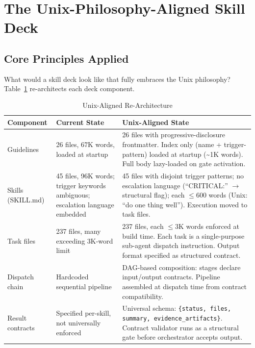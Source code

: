\documentclass[11pt,a4paper]{article}
\begin{document}
\newpage

\section{The Unix-Philosophy-Aligned Skill Deck}

\subsection{Core Principles Applied}

What would a skill deck look like that fully embraces the Unix philosophy?  Table~\ref{tab:rethink} re-architects each deck component.

\begin{table}[htbp]
\centering
\caption{Unix-Aligned Re-Architecture}
\label{tab:rethink}
\small
\begin{tabular}{@{}p{3cm}p{4.2cm}p{5.5cm}@{}}
\toprule
\textbf{Component}      & \textbf{Current State}                    & \textbf{Unix-Aligned State} \\
\midrule
Guidelines              & 26 files, 67K words, loaded at startup    & 26 files with progressive-disclosure frontmatter.  Index only (name + trigger-pattern) loaded at startup (\textasciitilde{}1K words).  Full body lazy-loaded on gate activation. \\
\midrule
Skills (SKILL.md)       & 45 files, 96K words; trigger keywords ambiguous; escalation language embedded & 45 files with disjoint trigger patterns; no escalation language (``CRITICAL:'' $\to$ structural flag); each $\leq$600 words (Unix: ``do one thing well'').  Execution moved to task files. \\
\midrule
Task files              & 237 files, many exceeding 3K-word limit   & 237 files, each $\leq$3K words enforced at build time.  Each task is a single-purpose sub-agent dispatch instruction.  Output format specified as structured contract. \\
\midrule
Dispatch chain          & Hardcoded sequential pipeline              & DAG-based composition: stages declare input/output contracts.  Pipeline assembled at dispatch time from contract compatibility. \\
\midrule
Result contracts        & Specified per-skill, not universally enforced & Universal schema: \texttt{\{status, files, summary, evidence\_artifacts\}}.  Contract validator runs as a structural gate before orchestrator accepts output. \\

\end{tabular}
\end{table}
\end{document}
